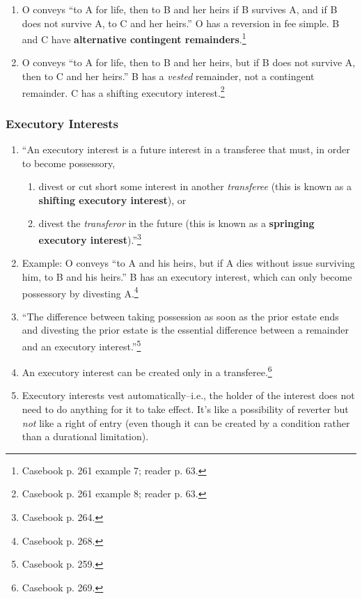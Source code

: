 \begin{enumerate}
\begin{enumerate}
        \item O conveys ``to A for life, then to B and her heirs if B survives 
        A, and if B does not survive A, to C and her heirs.'' O has a 
        reversion in fee simple. B and C have \textbf{alternative contingent 
        remainders}.\footnote{Casebook p. 261 example 7; reader p. 63.}
        \item O conveys ``to A for life, then to B and her heirs, but if B 
        does not survive A, then to C and her heirs.'' B has a \emph{vested} 
        remainder, not a contingent remainder. C has a shifting executory 
        interest.\footnote{Casebook p. 261 example 8; reader p. 63.}
    \end{enumerate}
\end{enumerate}

\subsubsection{Executory Interests}

\begin{enumerate}
    \item ``An executory interest is a future interest in a transferee that 
    must, in order to become possessory,
    \begin{enumerate}
        \item divest or cut short some interest in another \emph{transferee} 
        (this is known as a \textbf{shifting executory interest}), or
        \item divest the \emph{transferor} in the future (this is known as a 
        \textbf{springing executory interest}).''\footnote{Casebook p. 264.}
    \end{enumerate}
    \item Example: O conveys ``to A and his heirs, but if A dies without issue 
    surviving him, to B and his heirs.'' B has an executory interest, which 
    can only become possessory by divesting A.\footnote{Casebook p. 268.}
    \item ``The difference between taking possession as soon as the prior 
    estate ends and divesting the prior estate is the essential difference 
    between a remainder and an executory interest.''\footnote{Casebook p. 259.}
    \item An executory interest can be created only in a 
    transferee.\footnote{Casebook p. 269.}
    \item Executory interests vest automatically--i.e., the holder of the 
    interest does not need to do anything for it to take effect. It's like a 
    possibility of reverter but \emph{not} like a right of entry (even though 
    it can be created by a condition rather than a durational limitation).
\end{enumerate}

